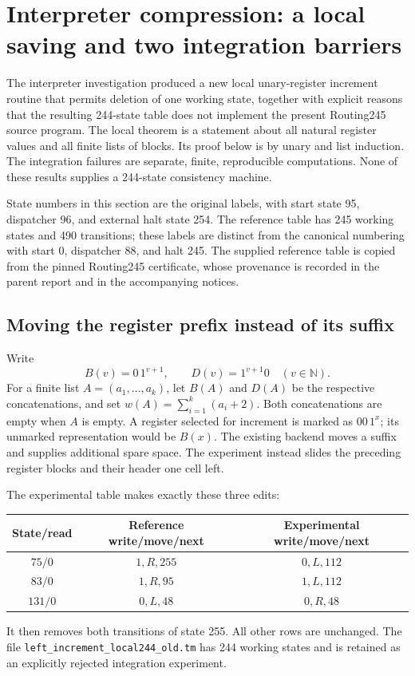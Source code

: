 \section{Interpreter compression: a local saving and two integration barriers}
\label{sec:interpreter-compression}

The interpreter investigation produced a new local unary-register increment
routine that permits deletion of one working state, together with explicit
reasons that the resulting 244-state table does not implement the present
Routing245 source program.  The local theorem is a statement about all natural
register values and all finite lists of blocks.  Its proof below is by unary
and list induction.  The integration failures are separate, finite,
reproducible computations.  None of these results supplies a 244-state
consistency machine.

State numbers in this section are the original labels, with start state 95,
dispatcher 96, and external halt state 254.  The reference table has 245
working states and 490 transitions; these labels are distinct from the
canonical numbering with start 0, dispatcher 88, and halt 245.  The supplied
reference table is copied from the pinned Routing245 certificate, whose
provenance is recorded in the parent report and in the accompanying notices.

\subsection{Moving the register prefix instead of its suffix}

Write
\[
 B(v)=0\,1^{v+1},\qquad D(v)=1^{v+1}0
 \quad(v\in\mathbb N).
\]
For a finite list $A=(a_1,\ldots,a_k)$, let $B(A)$ and $D(A)$ be the
respective concatenations, and set
$w(A)=\sum_{i=1}^k(a_i+2)$.  Both concatenations are empty when $A$ is
empty.  A register selected for increment is marked as $00\,1^x$; its
unmarked representation would be $B(x)$.  The existing backend moves a
suffix and supplies additional spare space.  The experiment instead
slides the preceding register blocks and their header one cell left.

The experimental table makes exactly these three edits:
\begin{center}
\begin{tabular}{c|c|c}
State/read & Reference write/move/next & Experimental write/move/next\\
\hline
$75/0$  & $1,R,255$ & $0,L,112$\\
$83/0$  & $1,R,95$  & $1,L,112$\\
$131/0$ & $0,L,48$  & $0,R,48$
\end{tabular}
\end{center}
It then removes both transitions of state 255.  All other rows are
unchanged.  The file \texttt{left\_\allowbreak increment\_\allowbreak local244\_\allowbreak old.tm} has 244
working states and is retained as an explicitly rejected integration
experiment.


